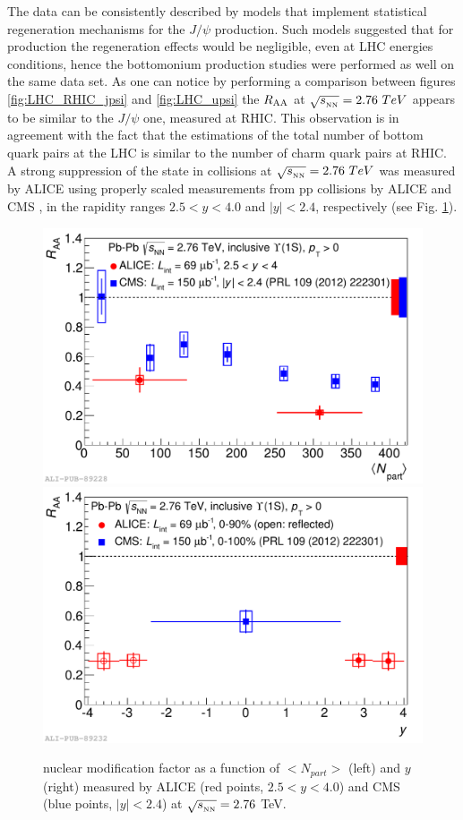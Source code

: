 The data can be consistently described by models that implement statistical regeneration mechanisms for the $J/\psi$ production.
Such models suggested that for \upsis production the regeneration effects would be negligible, even at LHC energies conditions, hence the bottomonium production studies were performed as well on the same data set.
As one can notice by performing a comparison between figures \ref{fig:LHC_RHIC_jpsi} and \ref{fig:LHC_upsi} the \upsi $R_{\rm{AA}}$ at $\sqrt{s_{_{\rm NN}}}=2.76\ TeV$ appears to be similar to the $J/\psi$ one, measured at RHIC.
This observation is in agreement with the fact that the estimations of the total number of bottom quark pairs at the LHC is similar to the number of charm quark pairs at RHIC.
A strong suppression of the \upsis state in \pbpb collisions at $\sqrt{s_{_{\rm NN}}}=2.76\ TeV$ was measured by ALICE using properly scaled measurements from pp collisions by ALICE \cite{Abelev:2014nua} and CMS \cite{Chatrchyan:2012lxa,Khachatryan:2016xxp}, in the rapidity ranges $2.5<y<4.0$ and $|y|<2.4$, respectively (see Fig. \ref{fig:ALICE_CMS_upsi}). 

\begin{figure}[!t]
\begin{center}
\includegraphics[width=0.47\linewidth]{Chapters/Analysis/Figs/2014-Nov-05-Raa_CMS_centr.pdf}
\includegraphics[width=0.47\linewidth]{Chapters/Analysis/Figs/2014-Nov-05-Raa_CMS_rap.pdf}
\caption{\upsis nuclear modification factor as a function of $<N_{part}>$ (left) and $y$ (right) measured by ALICE (red points, $2.5<y<4.0$) and CMS (blue points, $|y|<2.4$) at $\sqrt{s_{_{\rm NN}}}=2.76$ \rm{TeV}.}
\label{fig:ALICE_CMS_upsi}
\end{center}
\end{figure}

